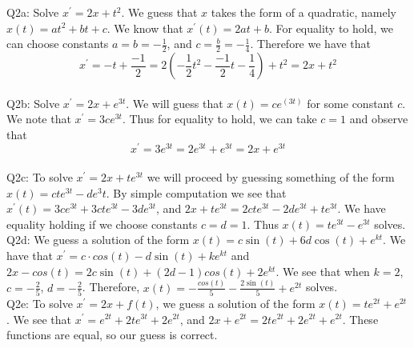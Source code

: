 \documentclass[letterpaper]{article}
\begin{document}
\noindent Q2a: Solve $x^\prime = 2x+t^2$. We guess that $x$ takes the form of a quadratic, namely $x(t)=at^2+bt+c$. We know that $x^\prime(t)=2at+b$. For equality to hold, we can choose constants $a=b=-\frac{1}{2}$, and $c=\frac{b}{2}=-\frac{1}{4}$. Therefore we have that 
$$x^\prime = -t+\frac{-1}{2} = 2(-\frac{1}{2}t^2-\frac{-1}{2}t-\frac{1}{4})+t^2=2x+t^2$$
\newline \\ Q2b: Solve $x^\prime = 2x + e^{3t}$. We will guess that $x(t)=ce^(3t)$ for some constant $c$. We note that $x^\prime=3ce^{3t}$. Thus for equality to hold, we can take $c=1$ and observe that 
$$x^\prime = 3e^{3t} = 2e^{3t}+e^{3t} = 2x+e^{3t}$$
\newline \\ Q2c: To solve $x^\prime = 2x + te^{3t}$ we will proceed by guessing something of the form $x(t) = cte^{3t}-de^3t$. By simple computation we see that $x^\prime(t)=3ce^{3t}+3cte^{3t}-3de^{3t}$, and $2x+te^{3t} = 2cte^{3t}-2de^{3t}+te^{3t}$. We have equality holding if we choose constants $c=d=1$. Thus $x(t)=te^{3t}-e^{3t}$ solves. 
\newline \\ Q2d: We guess a solution of the form $x(t)= c \sin(t) + 6d \cos(t) + e^{kt}$. We have that $x^\prime = c \cdot cos(t)-d\sin(t)+ke^{kt}$ and $2x-cos(t)=2c \sin(t) + (2d-1)cos(t) + 2e^{kt}$. We see that when $k=2$, $c=-\frac{2}{5}$, $d=-\frac{2}{5}$. Therefore, $x(t)=-\frac{cos(t)}{5}-\frac{2\sin(t)}{5}+e^{2t}$ solves. 
\newline \\ Q2e:  To solve $x^\prime = 2x+f(t)$, we guess a solution of the form  $x(t) = te^{2t}+ e^{2t}$. We see that $x^\prime = e^{2t} + 2te^{3t} + 2e^{2t}$, and $2x+e^{2t}=2te^{2t}+2e^{2t}+e^{2t}$. These functions are equal, so our guess is correct. 
\end{document}
